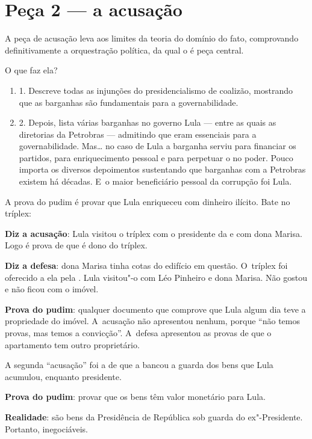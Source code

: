 \section{Peça 2 --- a acusação}

A peça de acusação leva aos limites da teoria do domínio do fato,
comprovando definitivamente a orquestração política, da qual o  é
peça central.

O que faz ela?

\begin{enumerate}
\itemsep1pt\parskip0pt
\item
  1. Descreve todas as injunções do presidencialismo de coalizão,
  mostrando que as barganhas são fundamentais para a governabilidade.
\item
  2. Depois, lista várias barganhas no governo Lula --- entre as quais
  as diretorias da Petrobras --- admitindo que eram essenciais para a
  governabilidade. Mas… no caso de Lula a barganha serviu para
  financiar os partidos, para enriquecimento pessoal e para perpetuar o
   no poder. Pouco importa os diversos depoimentos sustentando que
  barganhas com a Petrobras existem há décadas. E~o maior beneficiário
  pessoal da corrupção foi Lula.
\end{enumerate}

A prova do pudim é provar que Lula enriqueceu com dinheiro ilícito. Bate
no tríplex:

\textbf{Diz a acusação}: Lula visitou o tríplex com o presidente da 
e com dona Marisa. Logo é prova de que é dono do tríplex.

\textbf{Diz a defesa}: dona Marisa tinha cotas do edifício em questão. O~tríplex foi oferecido a ela pela . Lula visitou"-o com Léo Pinheiro e
dona Marisa. Não gostou e não ficou com o imóvel.

\textbf{Prova do pudim}: qualquer documento que comprove que Lula algum
dia teve a propriedade do imóvel. A~acusação não apresentou nenhum,
porque ``não temos provas, mas temos a convicção''. A~defesa apresentou
as provas de que o apartamento tem outro proprietário.

A segunda ``acusação'' foi a de que a  bancou a guarda dos bens que
Lula acumulou, enquanto presidente.

\textbf{Prova do pudim}: provar que os bens têm valor monetário para
Lula.

\textbf{Realidade}: são bens da Presidência de República sob guarda do
ex"-Presidente. Portanto, inegociáveis.

